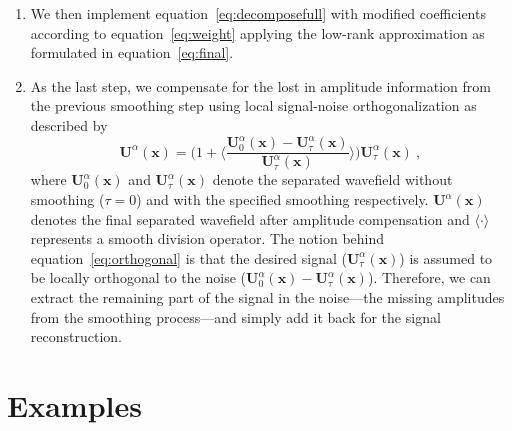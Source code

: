 \begin{enumerate}[leftmargin=*]
\item We then implement equation~\ref{eq:decomposefull} with modified coefficients according to equation~\ref{eq:weight} applying the low-rank approximation as formulated in equation~\ref{eq:final}. 
\item As the last step, we compensate for the lost in amplitude information from the previous smoothing step using local signal-noise orthogonalization \cite[]{yangkang} as described by
\begin{equation}
\label{eq:orthogonal}
\mathbf{U}^{\alpha}\mathbf{(x)} = \bigg(1+\Big\langle\frac{\mathbf{U}_{0}^{\alpha}\mathbf{(x)}-\mathbf{U}_{\tau}^{\alpha}\mathbf{(x)}}{\mathbf{U}_{\tau}^{\alpha}\mathbf{(x)}}\Big\rangle\bigg)\mathbf{U}^{\alpha}_{\tau}\mathbf{(x)}~,
\end{equation}
where $\mathbf{U}^{\alpha}_{0}\mathbf{(x)}$ and $\mathbf{U}^{\alpha}_{\tau}\mathbf{(x)}$ denote the separated wavefield without smoothing ($\tau=0$) and with the specified smoothing respectively. $\mathbf{U}^{\alpha}\mathbf{(x)}$ denotes the final separated wavefield after amplitude compensation and $\langle\cdot\rangle$ represents a smooth division operator. The notion behind equation~\ref{eq:orthogonal} is that the desired signal ($\mathbf{U}^{\alpha}_{\tau}\mathbf{(x)}$) is assumed to be locally orthogonal to the noise ($\mathbf{U}_{0}^{\alpha}\mathbf{(x)}-\mathbf{U}_{\tau}^{\alpha}\mathbf{(x)}$). Therefore, we can extract the remaining part of the signal in the noise---the missing amplitudes from the smoothing process---and simply add it back for the signal reconstruction.

\end{enumerate}

\section{Examples}

